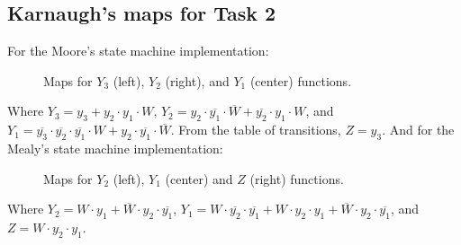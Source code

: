 



\subsection*{Karnaugh's maps for Task 2}
For the Moore's state machine implementation:
\begin{figure}[H]
    \begin{center}
    \begin{Karnaugh}
    \end{Karnaugh}
    \begin{Karnaugh}
    \end{Karnaugh}
    \begin{Karnaugh}
    \end{Karnaugh}
    \caption{Maps for $Y_3$ (left), $Y_2$ (right), and $Y_1$ (center) functions.}
\end{center}
\end{figure}

Where $Y_3 = y_3 + y_2 \cdot y_1 \cdot W$, $Y_2 = y_2 \cdot \overline{y_1} \cdot \overline{W} + \overline{y_2} \cdot y_1 \cdot W$,
and $Y_1 = \overline{y_3} \cdot \overline{y_2} \cdot \overline{y_1} \cdot W + y_2 \cdot \overline{y_1} \cdot \overline{W}$.
From the table of transitions, $Z = y_3$.
And for the Mealy's state machine implementation:

\begin{figure}[H]
    \begin{center}
         \begin{Karnaughvuit}
         \end{Karnaughvuit}
         \begin{Karnaughvuit}
         \end{Karnaughvuit}
         \begin{Karnaughvuit}
         \end{Karnaughvuit}
         \caption{Maps for $Y_2$ (left), $Y_1$ (center) and $Z$ (right) functions.}
    \end{center}
    \end{figure}
Where $Y_2 = W \cdot y_1 + \overline{W} \cdot y_2 \cdot \overline{y_1}$, $Y_1 = W \cdot \overline{y_2} \cdot \overline{y_1} + W \cdot y_2 \cdot y_1 + \overline{W} \cdot y_2 \cdot \overline{y_1}$, 
and $Z = W \cdot y_2 \cdot y_1$.
